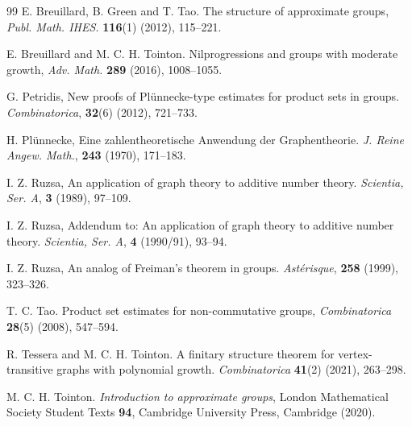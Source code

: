 \documentclass[10pt]{article}
\begin{document}
\begin{thebibliography}{99}
E. Breuillard, B. Green and T. Tao. The structure of approximate groups, \textit{Publ. Math. IHES.} \textbf{116}(1) (2012), 115--221.

E. Breuillard and M. C. H. Tointon. Nilprogressions and groups with moderate growth, \textit{Adv. Math.} \textbf{289} (2016), 1008--1055.

G. Petridis, New proofs of Pl\"unnecke-type estimates for product sets in groups. \textit{Combinatorica}, \textbf{32}(6) (2012), 721--733.

H. Pl\"unnecke, Eine zahlentheoretische Anwendung der Graphentheorie. \textit{J. Reine Angew. Math.}, \textbf{243} (1970), 171--183.

I. Z. Ruzsa, An application of graph theory to additive number theory. \textit{Scientia, Ser. A}, \textbf{3} (1989), 97--109.

I. Z. Ruzsa, Addendum to: An application of graph theory to additive number theory. \textit{Scientia, Ser. A}, \textbf{4} (1990/91), 93--94.

I. Z. Ruzsa, An analog of Freiman's theorem in groups. \textit{Ast\'{e}risque}, \textbf{258} (1999), 323--326.

T. C. Tao. Product set estimates for non-commutative groups, \textit{Combinatorica} \textbf{28}(5) (2008), 547--594.

R. Tessera and M. C. H. Tointon. A finitary structure theorem for vertex-transitive graphs with polynomial growth. \textit{Combinatorica} \textbf{41}(2) (2021), 263--298.

M. C. H. Tointon. \textit{Introduction to approximate groups}, London Mathematical Society Student Texts \textbf{94}, Cambridge University Press, Cambridge (2020).

\end{thebibliography}
\end{document}
